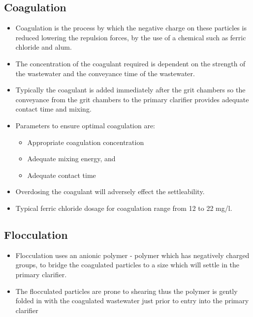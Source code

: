 \subsection{Coagulation}  
				                \begin{itemize}
									\item Coagulation is the process by which the negative charge on these particles is reduced lowering the repulsion forces, by the use of a chemical such as ferric chloride and alum.\\
									\item The concentration of the coagulant required is dependent on the strength of the wastewater and the conveyance time of the wastewater.
									\item Typically the coagulant is added immediately after the grit chambers so the conveyance from the grit chambers to the primary clarifier provides adequate contact time and mixing.\\
									\item Parameters to ensure optimal coagulation are:
										\begin{itemize}
											\item Appropriate coagulation concentration
											\item Adequate mixing energy, and
											\item Adequate contact time
										\end{itemize}
									\item Overdosing the coagulant will adversely effect the settleability.
									\item Typical ferric chloride dosage for coagulation range from 12 to 22 mg/l.
								\end{itemize}
\subsection{Flocculation}  
			                	\begin{itemize}
									\item Flocculation uses an anionic polymer - polymer which has negatively charged groups, to bridge the coagulated particles to a size which will settle in the primary clarifier.  
									\item The flocculated particles are prone to shearing thus the polymer is gently folded in with the coagulated wastewater just prior to entry into the primary clarifier
								\end{itemize}
					

